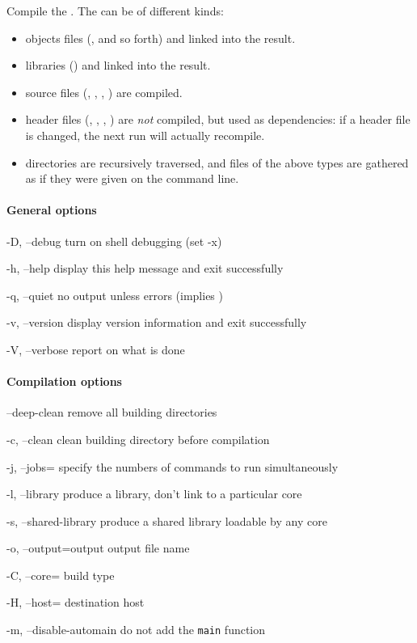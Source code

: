 Compile the .  The  can be of different kinds:
\begin{itemize}
\item objects files (,  and so forth) and linked
  into the result.
\item libraries () and linked into the result.
\item source files (, , , )
  are compiled.
\item header files (, , ,
  ) are \emph{not} compiled, but used as dependencies: if
  a header file is changed, the next  run will actually
  recompile.
\item directories are recursively traversed, and files of the above
  types are gathered as if they were given on the command line.
\end{itemize}

\paragraph{General options}
\begin{options}
\item[-D, --debug] turn on shell debugging (set -x)
\item[-h, --help] display this help message and exit successfully
\item[-q, --quiet] no output unless errors (implies )
\item[-v, --version] display version information and exit successfully
\item[-V, --verbose] report on what is done
\end{options}

\paragraph{Compilation options}
\begin{options}
\item[--deep-clean] remove all building directories
\item[-c, --clean] clean building directory before compilation
\item[-j, --jobs=\var{jobs}] specify the numbers of commands to run
  simultaneously
\item[-l, --library] produce a library, don't link to a particular
  core
\item[-s, --shared-library] produce a shared library loadable by any
  core
\item[-o, --output=output] output file name
\item[-C, --core=\var{core}] build type
\item[-H, --host=\var{host}] destination host
\item[-m, --disable-automain] do not add the \lstinline|main| function
\end{options}

